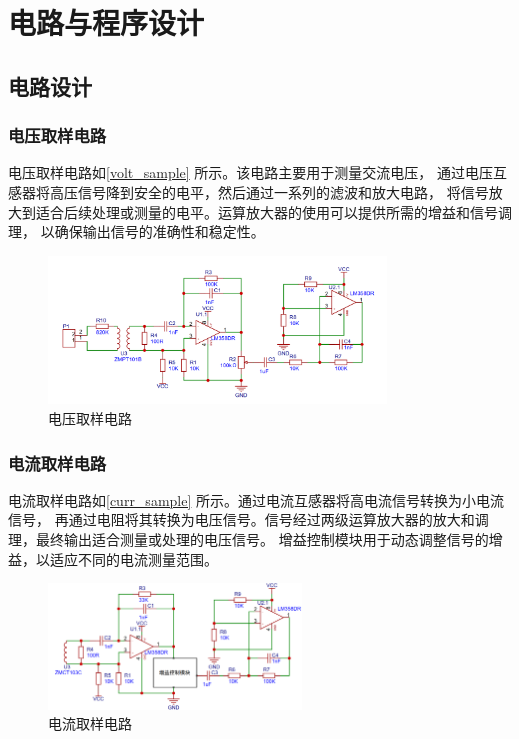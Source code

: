 \documentclass[a4paper,12pt,UTF8]{article}
\begin{document}
\section{电路与程序设计}
\subsection{电路设计}
\subsubsection{电压取样电路}
电压取样电路如\autoref{volt_sample} 所示。该电路主要用于测量交流电压，
通过电压互感器将高压信号降到安全的电平，然后通过一系列的滤波和放大电路，
将信号放大到适合后续处理或测量的电平。运算放大器的使用可以提供所需的增益和信号调理，
以确保输出信号的准确性和稳定性。
\begin{figure}[H]
    \centering
    \includegraphics[width=0.8\textwidth]{figures/volt_sample.png}
    \caption{电压取样电路}
    \label{volt_sample}
\end{figure}

\subsubsection{电流取样电路}
电流取样电路如\autoref{curr_sample} 所示。通过电流互感器将高电流信号转换为小电流信号，
再通过电阻将其转换为电压信号。信号经过两级运算放大器的放大和调理，最终输出适合测量或处理的电压信号。
增益控制模块用于动态调整信号的增益，以适应不同的电流测量范围。
\begin{figure}[H]
    \centering
    \includegraphics[width=0.6\textwidth]{figures/curr_sample.png}
    \caption{电流取样电路}
    \label{curr_sample}
\end{figure}
\end{document}
